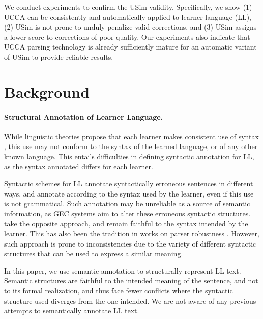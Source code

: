 \documentclass[a4paper, 11pt]{article}
\begin{document}
We conduct experiments to confirm the {\sc USim} validity.
Specifically, we show
(1) UCCA can be consistently and automatically applied to learner language (LL), 
(2) {\sc USim} is not prone to unduly penalize valid corrections, and 
(3) {\sc USim} assigns a lower score to corrections of poor quality.
Our experiments also indicate that UCCA parsing technology is already sufficiently mature for an automatic variant of {\sc USim} to provide reliable results.
\vspace{-.6cm}

\section{Background}
\vspace{-.1cm}

\paragraph{Structural Annotation of Learner Language.}
While linguistic theories propose that each learner makes consistent use of syntax 
\cite{huebner1985system,tarone1983variability}, this use may not conform to the syntax of the learned language, 
or of any other known language. This entails difficulties in defining syntactic annotation for LL, as the syntax annotated differs for each learner.

Syntactic schemes for LL annotate syntactically erroneous sentences in different ways.
 and  annotate according 
to the syntax used by the learner, even if this use is not grammatical.
Such annotation may be unreliable as a source of semantic information, 
as GEC systems aim to alter these erroneous syntactic structures.
 take the opposite approach, and remain faithful to the syntax intended by the learner.
This has also been the tradition in works on parser robustness 
\cite{bigert2005unsupervised,foster2004parsing}. However, such approach is prone to inconsistencies due to the 
variety of different syntactic structures that can be used to express a similar meaning. 

In this paper, we use semantic annotation to structurally
represent LL text. Semantic structures are faithful to the intended
meaning of the sentence, and not to its formal realization, and thus face
fewer conflicts where the syntactic structure used diverges from
the one intended. We are not aware of any previous attempts to semantically
annotate LL text.
\end{document}
